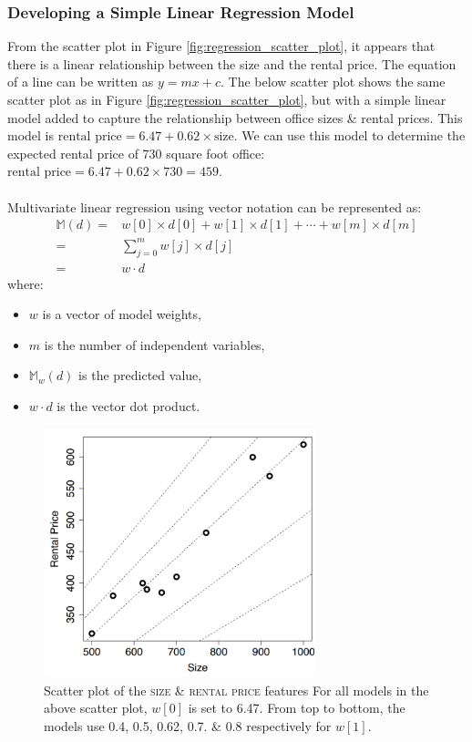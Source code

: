\documentclass[a4paper,11pt]{article}
\begin{document}
\subsubsection{Developing a Simple Linear Regression Model}
From the scatter plot in Figure \ref{fig:regression_scatter_plot}, it appears that there is a linear relationship between the size and the rental price.
The equation of a line can be written as $y = mx + c$.
The below scatter plot shows the same scatter plot as in Figure \ref{fig:regression_scatter_plot}, but with a simple linear model added to capture the relationship between office sizes \& rental prices.
This model is $\text{rental price} = 6.47 + 0.62 \times \text{size}$.
We can use this model to determine the expected rental price of 730 square foot office:
$\text{rental price} = 6.47 + 0.62 \times 730 = 459$.
\\\\
Multivariate linear regression using vector notation can be represented as:
\begin{align*}
    \mathbb{M}(d)   =& w[0] \times d[0] + w[1] \times d[1] + \cdots + w[m] \times d[m] \\
    =& \sum^m_{j=0} w[j] \times d[j] \\
    =& w \cdot d
\end{align*}
where:
\begin{itemize}
    \item   $w$ is a vector of model weights,
    \item   $m$ is the number of independent variables,
    \item   $\mathbb{M}_w(d)$ is the predicted value,
    \item   $w \cdot d$ is the vector dot product.
\end{itemize}

\begin{figure}[H]
    \centering
    \includegraphics[width=0.7\textwidth]{images/simplelinearregressionmodel.png}
    \caption{
        Scatter plot of the \textsc{size} \& \textsc{rental price} features
        For all models in the above scatter plot, $w[0]$ is set to 6.47.
        From top to bottom, the models use 0.4, 0.5, 0.62, 0.7. \& 0.8 respectively for $w[1]$.
    }
\end{figure}
\end{document}
